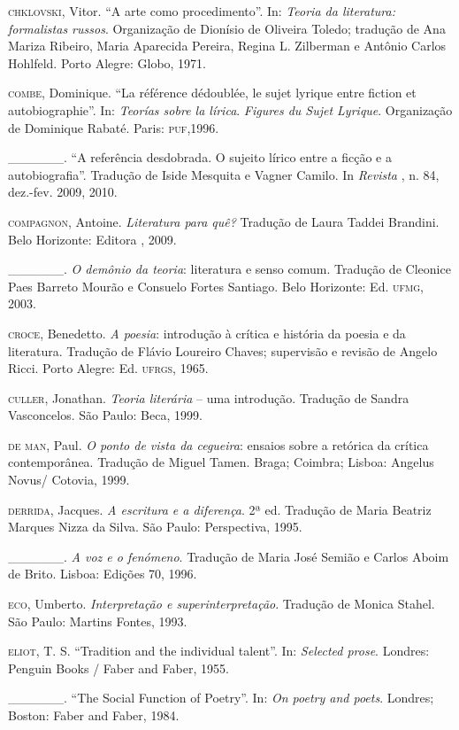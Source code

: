 \begin{hangparas}{.35in}{1}
\textsc{chklovski}, Vitor. ``A arte como procedimento''. In: \emph{Teoria da
literatura: formalistas russos}. Organização de Dionísio de Oliveira
Toledo; tradução de Ana Mariza Ribeiro, Maria Aparecida Pereira, Regina
L. Zilberman e Antônio Carlos Hohlfeld. Porto Alegre: Globo, 1971.

\textsc{combe}, Dominique. ``La référence dédoublée, le sujet lyrique
entre fiction et autobiographie''. In: \emph{Teorías sobre la lírica}.
\emph{Figures du Sujet Lyrique}. Organização de Dominique Rabaté. Paris:
\textsc{puf},1996.

\_\_\_\_\_\_. ``A referência desdobrada. O sujeito lírico entre a ficção
e a autobiografia''. Tradução de Iside Mesquita e Vagner Camilo. In
\emph{Revista }, n. 84, dez.-fev. 2009, 2010.

\textsc{compagnon}, Antoine. \emph{Literatura para quê?} Tradução de
Laura Taddei Brandini. Belo Horizonte: Editora , 2009.

\_\_\_\_\_\_. \emph{O demônio da teoria}: literatura e senso comum.
Tradução de Cleonice Paes Barreto Mourão e Consuelo Fortes Santiago.
Belo Horizonte: Ed. \textsc{ufmg}, 2003.

\textsc{croce}, Benedetto. \emph{A poesia}: introdução à crítica e
história da poesia e da literatura. Tradução de Flávio Loureiro
Chaves; supervisão e revisão de Angelo Ricci. Porto Alegre: Ed.
\textsc{ufrgs}, 1965.

\textsc{culler}, Jonathan. \emph{Teoria literária} -- uma introdução.
Tradução de Sandra Vasconcelos. São Paulo: Beca, 1999.

\textsc{de man}, Paul. \emph{O ponto de vista da cegueira}: ensaios
sobre a retórica da crítica contemporânea. Tradução de Miguel Tamen.
Braga; Coimbra; Lisboa: Angelus Novus/ Cotovia, 1999.

\textsc{derrida}, Jacques. \emph{A escritura e a diferença}. 2ª ed.
Tradução de Maria Beatriz Marques Nizza da Silva. São Paulo:
Perspectiva, 1995.

\_\_\_\_\_\_. \emph{A voz e o fenómeno}. Tradução de Maria José Semião e
Carlos Aboim de Brito. Lisboa: Edições 70, 1996.

\textsc{eco}, Umberto. \emph{Interpretação e superinterpretação}.
Tradução de Monica Stahel. São Paulo: Martins Fontes, 1993.

\textsc{eliot}, T. S. ``Tradition and the individual talent''. In:
\emph{Selected prose}. Londres: Penguin Books / Faber and Faber, 1955.

\_\_\_\_\_\_. ``The Social Function of Poetry''. In: \emph{On poetry and
poets}. Londres; Boston: Faber and Faber, 1984.


\end{hangparas}
